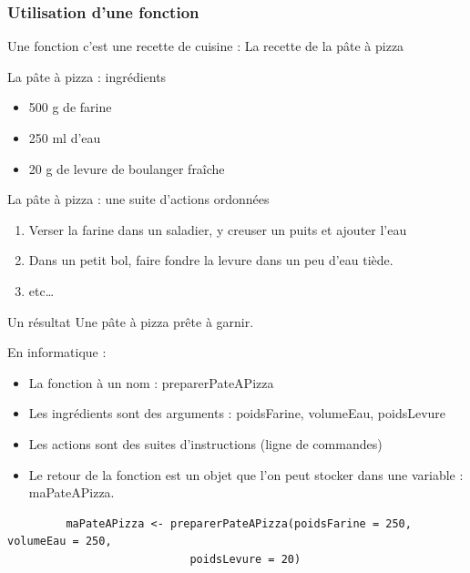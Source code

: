 \documentclass[handout, table,svgnames,hyperref={pdfpagemode=FullScreen}]{beamer}
\begin{document}
\begin{frame}
	\frametitle{Utilisation d'une fonction}
	Une fonction c'est une recette de cuisine : La recette de la pâte à pizza
	\begin{exampleblock}{La pâte à pizza  : ingrédients}
		\begin{itemize}
			\item 500 g de farine
			\item 250 ml d'eau
			\item 20 g de levure de boulanger fraîche
		\end{itemize}
	\end{exampleblock}
\end{frame}
\begin{frame}
	\begin{exampleblock}{La pâte à pizza :  une suite d'actions ordonnées}
		\begin{enumerate}
			\item Verser la farine dans un saladier, y creuser un puits et ajouter l'eau
			\item Dans un petit bol, faire fondre la levure dans un peu d'eau tiède.
			\item etc\dots
		\end{enumerate}
			
	\end{exampleblock}
\end{frame}
\begin{frame}
	\begin{exampleblock}{Un résultat}
		Une pâte à pizza prête à garnir.
	\end{exampleblock}
\end{frame}
\begin{frame}[fragile]
	\begin{exampleblock}{En informatique : }
		\begin{itemize}
			\item La fonction à un nom  : preparerPateAPizza
			\item Les ingrédients sont des arguments : poidsFarine, volumeEau, poidsLevure
			\item Les actions sont des suites d'instructions (ligne de commandes)
			\item Le retour de la fonction est un objet que l'on peut stocker dans une variable : maPateAPizza.
		\end{itemize}
		\begin{lstlisting}
		 maPateAPizza <- preparerPateAPizza(poidsFarine = 250, volumeEau = 250, 
							poidsLevure = 20) 
		 \end{lstlisting}
	\end{exampleblock}
	
\end{frame}
\end{document}
